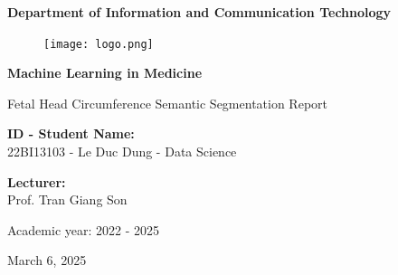 \documentclass[twocolumn]{article}
\begin{document}
\begin{titlepage}
    \centering
    \vspace*{1cm}
    
    {\LARGE \bfseries Department of Information and Communication Technology \par}

    \begin{figure}[H]
        \centering
        \texttt{[image: logo.png]}
        \label{fig:enter-label}
    \end{figure}
    
    \vspace{1cm}
    
    {\Huge \bfseries Machine Learning in Medicine \par}
    
    \vspace{1cm}
    
    {\Large Fetal Head Circumference Semantic Segmentation Report \par}
    
    \vfill
    
    \begin{minipage}{0.5\textwidth}
        \begin{flushleft}
            {\large \textbf{ID - Student Name:}} \\
            22BI13103 - Le Duc Dung - Data Science
        \end{flushleft}
    \end{minipage}%
    \begin{minipage}{0.5\textwidth}
        \begin{flushright}
            {\large \textbf{Lecturer:}} \\
            Prof. Tran Giang Son
        \end{flushright}
    \end{minipage}
    
    \vspace{2cm}
    
    {\large Academic year: 2022 - 2025} \par
    
    \vspace{1cm}
    
    {March 6, 2025}
    
\end{titlepage}

\begin{abstract}
The fetal head circumference (HC) is a useful tool to monitor gestational age in fetuses. I implemented a U-Net automation pipeline for computing the HC from 2D ultrasound images using annotation as patterns for model learning to perform a semantic segmentation task.
\end{abstract}
\end{document}
